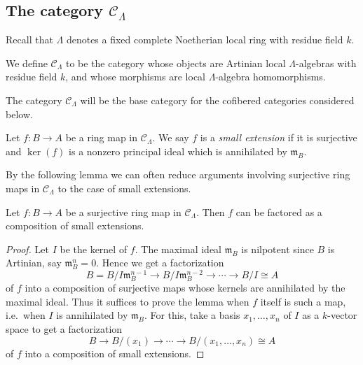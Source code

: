 \subsection{The category $\mathcal C_{\Lambda}$}
\label{subsection-CLambda}

\noindent
Recall that $\Lambda$ denotes a fixed complete Noetherian local ring with 
residue field $k$.

\begin{definition}
\label{definition-CLambda}
We define {\it $\mathcal C_{\Lambda}$} to be the category whose objects are
Artinian local $\Lambda$-algebras with residue field $k$, and whose morphisms
are local $\Lambda$-algebra homomorphisms.
\end{definition}

\noindent
The category $\mathcal C_{\Lambda}$ will be the base category for the cofibered 
categories considered below.

\begin{definition}
\label{definition-small-extension}
Let $f: B \rightarrow A$ be a ring map in $\mathcal C_{\Lambda}$.  We say $f$ 
is a {\it small extension} if it is surjective and $\ker(f)$ is a nonzero 
principal ideal which is annihilated by $\mathfrak{m}_{B}$.
\end{definition}

\noindent 
By the following lemma we can often reduce arguments involving surjective ring 
maps in $\mathcal C_{\Lambda}$ to the case of small extensions.

\begin{lemma}
\label{lemma-factor-small-extension}
Let $f: B \rightarrow A$ be a surjective ring map in $\mathcal C_{\Lambda}$. 
Then $f$ can be factored as a composition of small extensions.
\end{lemma}

\begin{proof}
Let $I$ be the kernel of $f$.  The maximal ideal $\mathfrak{m}_{B}$ is 
nilpotent since $B$ is Artinian, say $\mathfrak{m}_{B}^n = 0$. Hence we get a 
factorization
\[ B = B/I\mathfrak{m}_B^{n-1} \rightarrow B/I\mathfrak{m}_B^{n-2} \rightarrow 
\cdots \rightarrow B/I \cong A \]
of $f$ into a composition of surjective maps whose kernels are annihilated by 
the maximal ideal.  Thus it suffices to prove the lemma when $f$ itself is such 
a map, i.e.\ when $I$ is annihilated by $\mathfrak{m}_B$. For this, take a 
basis $x_1, \dots, x_n$ of $I$ as a $k$-vector space to get a factorization
\[ B \rightarrow B/(x_1) \rightarrow \cdots \rightarrow  B/(x_1, \dots, x_n) 
\cong  A \]
of $f$ into a composition of small extensions.
\end{proof}

